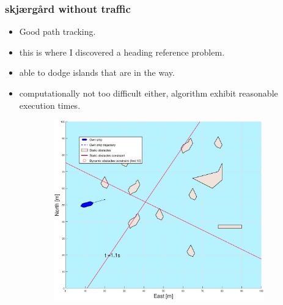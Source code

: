 \subsubsection{skjærgård without traffic}
\begin{itemize}
    \item Good path tracking.
    \item this is where I discovered a heading reference problem.
    \item able to dodge islands that are in the way.
    \item computationally not too difficult either, algorithm exhibit reasonable execution times.
\end{itemize}

\clearpage
\begin{figure}[!b] %
    \begin{subfigure}[b]{0.49\textwidth}
        \centering
        \includegraphics[width=\textwidth]{Images/Figures/skjergard_u_trafikk/_Simple_1fig1_time=1}
    \end{subfigure}
    \hfill
    \begin{subfigure}[b]{0.499\textwidth}
        \centering

\end{subfigure}
\end{figure}
